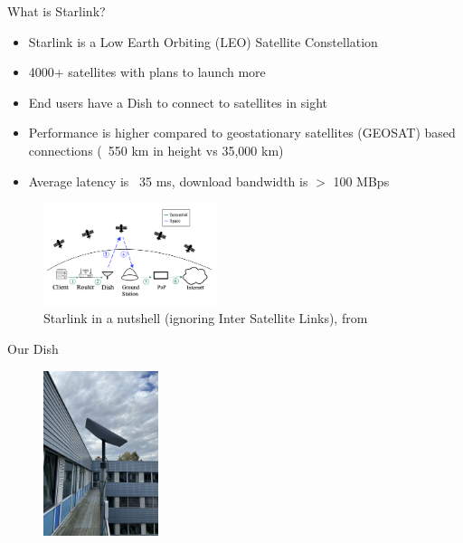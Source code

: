 \documentclass[NET,english,beameralt]{tumbeamer}
\begin{document}
\begin{frame}{What is Starlink?}
    \begin{itemize}
        \item Starlink is a Low Earth Orbiting (LEO) Satellite Constellation
        \item 4000+ satellites with plans to launch more
        \item End users have a Dish to connect to satellites in sight
        \item Performance is higher compared to geostationary satellites (GEOSAT) based connections (~550 km in height vs 35,000 km)
        \item Average latency is ~35 ms, download bandwidth is $>$ 100 MBps
    \end{itemize}

    \begin{figure}
        \includegraphics[width=0.45\textwidth]{pics/starlink-101.png}
        \caption{Starlink in a nutshell (ignoring Inter Satellite Links), from \cite{izhikevich2023democratizing}}
    \end{figure}
\end{frame}

\begin{frame}{Our Dish}
    \begin{figure}
        \includegraphics[width=0.3\textwidth]{pics/dish.jpeg}
    \end{figure}
\end{frame}
\end{document}
